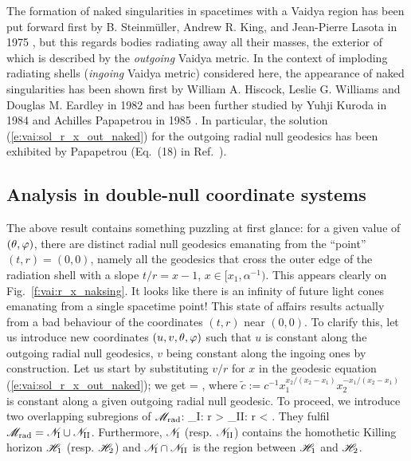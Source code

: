 \begin{hist}
The formation of naked singularities in spacetimes with a Vaidya region
has been put forward first by B. Steinmüller, Andrew R. King, and Jean-Pierre Lasota
in 1975 \cite{SteinmKL75}, but this regards bodies radiating away all their masses, the exterior of which
is described by the \emph{outgoing} Vaidya metric. In the context of imploding
radiating shells (\emph{ingoing} Vaidya metric) considered here, the appearance of naked singularities
has been shown first by William A. Hiscock, Leslie G. Williams and Douglas M. Eardley in 1982 \cite{HiscoWE82} and has been further studied by
Yuhji Kuroda in 1984 \cite{Kurod84} and Achilles Papapetrou in 1985 \cite{Papap85}. In particular, the solution (\ref{e:vai:sol_r_x_out_naked}) for the
outgoing radial null geodesics has been exhibited by Papapetrou (Eq.~(18) in Ref.~\cite{Papap85}).
\end{hist}

\subsection{Analysis in double-null coordinate systems} \label{s:vai:analysis_double_null}

The above result contains something puzzling at first glance: for a given
value of $(\theta,\varphi)$, there are distinct radial null geodesics emanating
from the ``point'' $(t, r) = (0,0)$, namely all the geodesics that
cross the outer edge of the radiation shell with a slope $t/r = x - 1$,
$x\in [x_1, \alpha^{-1})$. %
This appears clearly on Fig.~\ref{f:vai:r_x_naksing}.
It looks like there is an infinity of future light cones emanating
from a single spacetime point!
This state of affairs results actually from a bad behaviour of the coordinates
$(t, r)$ near $(0,0)$. To clarify this, let us introduce new coordinates
$(u, v, \theta, \varphi)$ such that $u$ is constant along the
outgoing radial null geodesics, $v$ being constant along
the ingoing ones by construction. Let us start by substituting $v/r$ for $x$ in
the geodesic equation (\ref{e:vai:sol_r_x_out_naked}); we get
\be \label{e:vai:v_r_out_naked}
     = ,
\ee
where $\tilde{c} := c^{-1} x_1^{x_2/(x_2 - x_1)} x_2^{-x_1/(x_2 - x_1)}$ is
constant along a given outgoing radial null geodesic.
To proceed, we introduce two overlapping subregions of $\mathscr{M}_{\rm rad}$:
\be \label{e:vai:def_NI_NII}
    _{\rm I}: r >  \qand
    _{\rm II}: r <  .
\ee
They fulfil $\mathscr{M}_{\rm rad} = \mathscr{N}_{\rm I} \cup \mathscr{N}_{\rm II}$.
Furthermore, $\mathscr{N}_{\rm I}$ (resp.  $\mathscr{N}_{\rm II}$)
contains the homothetic Killing horizon $\mathscr{H}_1$ (resp. $\mathscr{H}_2$)
and $\mathscr{N}_{\rm I} \cap \mathscr{N}_{\rm II}$ is the region
between $\mathscr{H}_1$ and $\mathscr{H}_2$.


